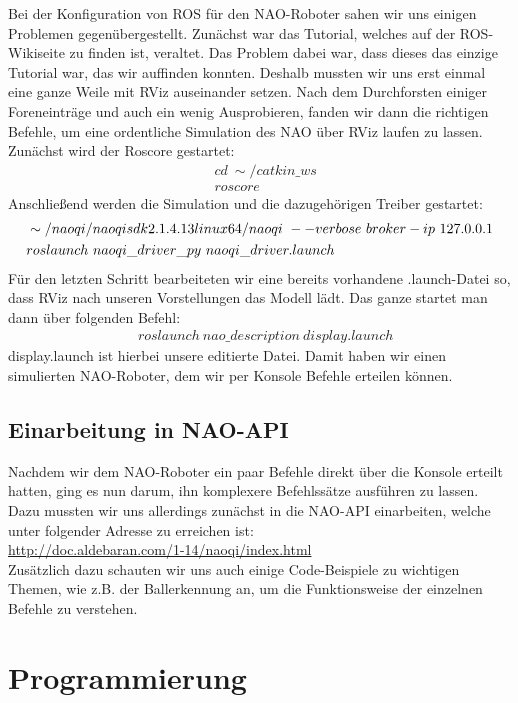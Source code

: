 \documentclass{scrartcl}
\begin{document}
Bei der Konfiguration von ROS für den NAO-Roboter sahen wir uns einigen Problemen gegenübergestellt. Zunächst war das Tutorial, welches auf der ROS-Wikiseite zu finden ist, veraltet. Das Problem dabei war, dass dieses das einzige Tutorial war, das wir auffinden konnten. Deshalb mussten wir uns erst einmal eine ganze Weile mit RViz auseinander setzen. Nach dem Durchforsten einiger Foreneinträge und auch ein wenig Ausprobieren, fanden wir dann die richtigen Befehle, um eine ordentliche Simulation des NAO über RViz laufen zu lassen.
Zunächst wird der Roscore gestartet:
\begin{align}
&cd\ \sim/catkin\_ws\\
&roscore
\end{align}
Anschließend werden die Simulation und die dazugehörigen Treiber gestartet:
\begin{align}
&\sim/naoqi/naoqi\-sdk\-2.1.4.13\-linux64/naoqi\ --verbose\ \-\-broker-ip\ 127.0.0.1\\
&roslaunch\ naoqi\_driver\_py\ naoqi\_driver.launch
\end{align}
Für den letzten Schritt bearbeiteten wir eine bereits vorhandene .launch-Datei so, dass RViz nach unseren Vorstellungen das Modell lädt. Das ganze startet man dann über folgenden Befehl:
\begin{align}
&roslaunch\ nao\_description\ display.launch
\end{align}
display.launch ist hierbei unsere editierte Datei.
Damit haben wir einen simulierten NAO-Roboter, dem wir per Konsole Befehle erteilen können.

\subsection{Einarbeitung in NAO-API}

Nachdem wir dem NAO-Roboter ein paar Befehle direkt über die Konsole erteilt hatten, ging es nun darum, ihn komplexere Befehlssätze ausführen zu lassen. 
Dazu mussten wir uns allerdings zunächst in die NAO-API einarbeiten, welche unter folgender Adresse zu erreichen ist:\\
\url{http://doc.aldebaran.com/1-14/naoqi/index.html} \\
Zusätzlich dazu schauten wir uns auch einige Code-Beispiele zu wichtigen Themen, wie z.B. der Ballerkennung an, um die Funktionsweise der einzelnen Befehle zu verstehen.


\section{Programmierung}
\end{document}

